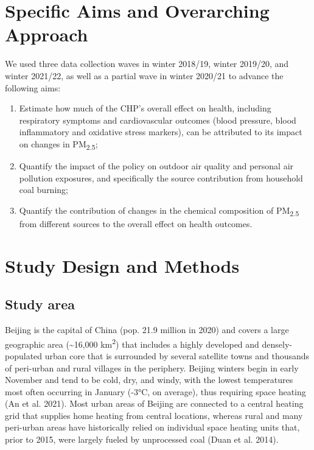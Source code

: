 \documentclass[
  letterpaper,
  DIV=11,
  numbers=noendperiod]{scrartcl}
\begin{document}
\section{Specific Aims and Overarching
Approach}\label{specific-aims-and-overarching-approach}

We used three data collection waves in winter 2018/19, winter 2019/20,
and winter 2021/22, as well as a partial wave in winter 2020/21 to
advance the following aims:

\begin{enumerate}
\def\labelenumi{\arabic{enumi}.}
\item
  Estimate how much of the CHP's overall effect on health, including
  respiratory symptoms and cardiovascular outcomes (blood pressure,
  blood inflammatory and oxidative stress markers), can be attributed to
  its impact on changes in PM\textsubscript{2.5};
\item
  Quantify the impact of the policy on outdoor air quality and personal
  air pollution exposures, and specifically the source contribution from
  household coal burning;
\item
  Quantify the contribution of changes in the chemical composition of
  PM\textsubscript{2.5} from different sources to the overall effect on
  health outcomes.
\end{enumerate}

\section{Study Design and Methods}\label{study-design-and-methods}

\subsection{Study area}\label{study-area}

Beijing is the capital of China (pop. 21.9 million in 2020) and covers a
large geographic area (\textasciitilde16,000 km\textsuperscript{2}) that
includes a highly developed and densely-populated urban core that is
surrounded by several satellite towns and thousands of peri-urban and
rural villages in the periphery. Beijing winters begin in early November
and tend to be cold, dry, and windy, with the lowest temperatures most
often occurring in January (-3°C, on average), thus requiring space
heating (An et al. 2021). Most urban areas of Beijing are connected to a
central heating grid that supplies home heating from central locations,
whereas rural and many peri-urban areas have historically relied on
individual space heating units that, prior to 2015, were largely fueled
by unprocessed coal (Duan et al. 2014).
\end{document}
